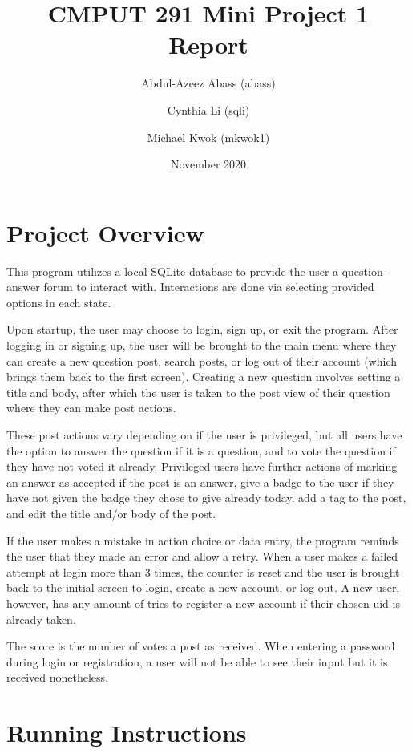 \documentclass{article}
\title{CMPUT 291 Mini Project 1 Report}
\date{November 2020}
\author{Abdul-Azeez Abass (abass)\\
\and Cynthia Li (sqli)\\
\and Michael Kwok (mkwok1)}
\begin{document}
\maketitle

\section{Project Overview}

This program utilizes a local SQLite database to provide the user a question-answer forum to interact with. Interactions are done via selecting provided options in each state.

Upon startup, the user may choose to login, sign up, or exit the program. After logging in or signing up, the user will be brought to the main menu where they can create a new question post, search posts, or log out of their account (which brings them back to the first screen). Creating a new question involves setting a title and body, after which the user is taken to the post view of their question where they can make post actions.

These post actions vary depending on if the user is privileged, but all users have the option to answer the question if it is a question, and to vote the question if they have not voted it already. Privileged users have further actions of marking an answer as accepted if the post is an answer, give a badge to the user if they have not given the badge they chose to give already today, add a tag to the post, and edit the title and/or body of the post.

If the user makes a mistake in action choice or data entry, the program reminds the user that they made an error and allow a retry. When a user makes a failed attempt at login more than 3 times, the counter is reset and the user is brought back to the initial screen to login, create a new account, or log out. A new user, however, has any amount of tries to register a new account if their chosen uid is already taken.

The score is the number of votes a post as received. When entering a password during login or registration, a user will not be able to see their input but it is received nonetheless.

\section{Running Instructions}
\end{document}
